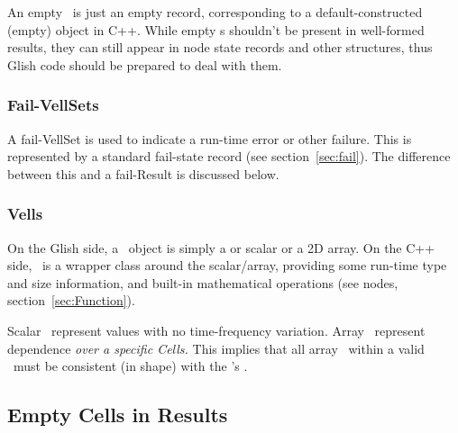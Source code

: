   An empty \VellSet\ is just an empty record, corresponding to a
  default-constructed (empty) object in C++. While empty \VellSet{}s shouldn't
  be present in well-formed results, they can still appear in node state
  records and other structures, thus Glish code should be prepared to deal with
  them.
  
  \subsubsection{Fail-VellSets}

  A fail-VellSet is used to indicate a run-time error or other failure. This
  is represented by a standard fail-state record (see section~\ref{sec:fail}).
  The difference between this and a fail-Result is discussed below.

\subsubsection{Vells}

  On the Glish side, a \Vells\ object is simply a  or 
  scalar or a 2D array. On the C++ side, \Vells\ is a wrapper class around the
  scalar/array, providing some run-time type and size information, and built-in
  mathematical operations (see  nodes, section~\ref{sec:Function}).

  Scalar \Vells\ represent values with no time-frequency variation. Array
  \Vells\ represent dependence {\em over a specific Cells.} This implies that
  all array \Vells\ within a valid \Result\ must be consistent (in shape) with
  the \Result's \Cells.

\subsection{Empty Cells in Results}
  \label{sec:result-empty-cells} 
  
